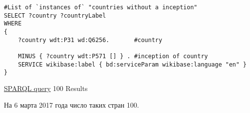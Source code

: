 \begin{lstlisting}[language=SPARQL]
#List of `instances of` "countries without a inception" 
SELECT ?country ?countryLabel 
WHERE
{
    ?country wdt:P31 wd:Q6256.       #country
    
    MINUS { ?country wdt:P571 [] } . #inception of country
    SERVICE wikibase:label { bd:serviceParam wikibase:language "en" }
}
\end{lstlisting}

\href{https://query.wikidata.org/#%23List%20of%20%60instances%20of%60%20%22countries%20without%20a%20inception%22%20%0ASELECT%20%3Fcountry%20%3FcountryLabel%20%0AWHERE%0A%7B%0A%20%20%20%20%3Fcountry%20wdt%3AP31%20wd%3AQ6256.%20%23country%0A%20%20%20%20%0A%20%20%20%20MINUS%20%7B%20%3Fcountry%20wdt%3AP571%20%5B%5D%20%7D%20.%20%23inception%20of%20country%0A%20%20%20%20SERVICE%20wikibase%3Alabel%20%7B%20bd%3AserviceParam%20wikibase%3Alanguage%20%22en%22%20%7D%0A%7D%0A%0A}{SPARQL query} 100 Results

На 6 марта 2017 года число таких стран 100.
\\~